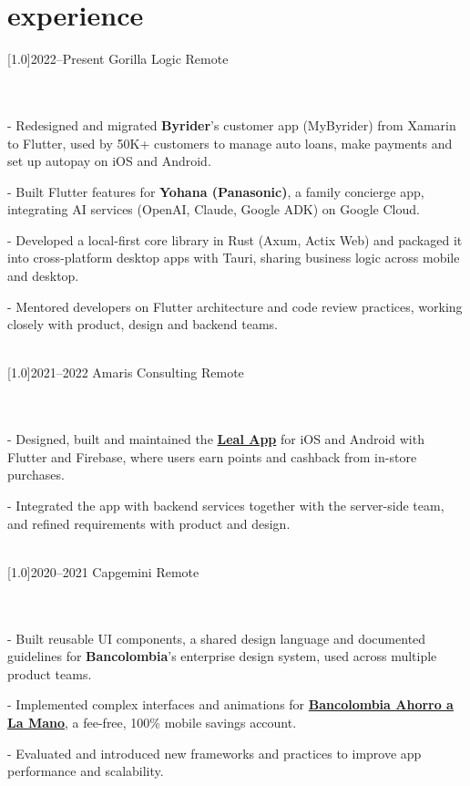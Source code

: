 \documentclass[english]{cv-style}     %
\begin{document}
\section{experience}
  \vspace{-0.2cm}
\begin{entrylist}
\entry
  {\scalebox{.8}[1.0]{2022--Present}}
  {Gorilla Logic}
  {Remote}
  {\\\\
  - Redesigned and migrated \textbf{Byrider}'s customer app (MyByrider) from Xamarin to Flutter, used by 50K+ customers to manage auto loans, make payments and set up autopay on iOS and Android.

  - Built Flutter features for \textbf{Yohana (Panasonic)}, a family concierge app, integrating AI services (OpenAI, Claude, Google ADK) on Google Cloud.

  - Developed a local-first core library in Rust (Axum, Actix Web) and packaged it into cross-platform desktop apps with Tauri, sharing business logic across mobile and desktop.

  - Mentored developers on Flutter architecture and code review practices, working closely with product, design and backend teams.
 }
  \\
\entry
  {\scalebox{.8}[1.0]{2021--2022}}
  {Amaris Consulting}
  {Remote}
  {\\\\
  - Designed, built and maintained the \href{https://play.google.com/store/apps/details?id=com.kubo.leal}{\textbf{Leal App}} for iOS and Android with Flutter and Firebase, where users earn points and cashback from in-store purchases.

  - Integrated the app with backend services together with the server-side team, and refined requirements with product and design.
 }
  \\
\entry
  {\scalebox{.8}[1.0]{2020--2021}}
  {Capgemini}
  {Remote}
  {\\\\
  - Built reusable UI components, a shared design language and documented guidelines for \textbf{Bancolombia}'s enterprise design system, used across multiple product teams.

  - Implemented complex interfaces and animations for \href{https://play.google.com/store/apps/details?id=co.com.tcs.bancolombia.bancaalamano}{\textbf{Bancolombia Ahorro a La Mano}}, a fee-free, 100\% mobile savings account.

  - Evaluated and introduced new frameworks and practices to improve app performance and scalability.
  }
\end{entrylist}
\end{document}

